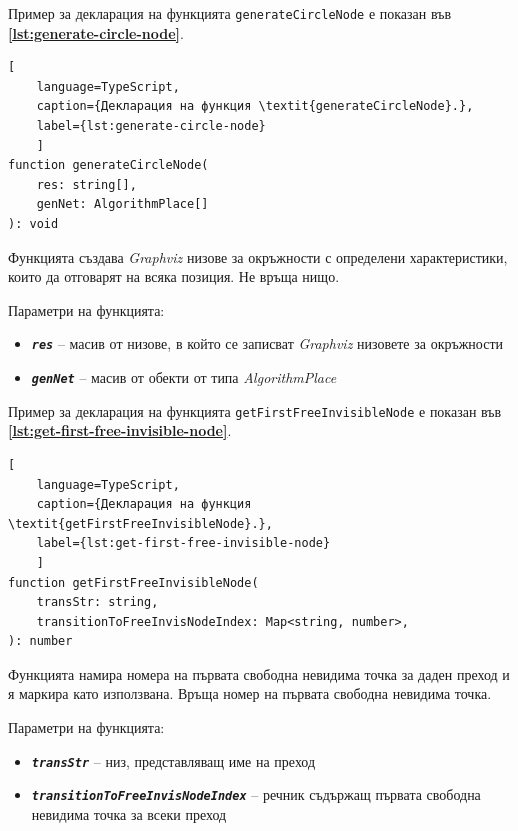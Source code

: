 \vspace{0.55cm}

Пример за декларация на функцията \texttt{generateCircleNode} е показан във \textbf{\autoref{lst:generate-circle-node}}.
\begin{lstlisting}[
	language=TypeScript,
	caption={Декларация на функция \textit{generateCircleNode}.},
	label={lst:generate-circle-node}
	]
function generateCircleNode(
    res: string[],
    genNet: AlgorithmPlace[]
): void
\end{lstlisting}

Функцията създава \textit{Graphviz} низове за окръжности с определени характеристики, които да отговарят на всяка позиция. Не връща нищо.

Параметри на функцията:

\vspace{-0.3cm}

\begin{itemize}
	\item \texttt{\textbf{\textit{res}}} -- масив от низове, в който се записват \textit{Graphviz} низовете за окръжности
	\item \texttt{\textbf{\textit{genNet}}} -- масив от обекти от типа \textit{AlgorithmPlace}
\end{itemize}

\vspace{0.55cm}
Пример за декларация на функцията \texttt{getFirstFreeInvisibleNode} е показан във \textbf{\autoref{lst:get-first-free-invisible-node}}.
\begin{lstlisting}[
	language=TypeScript,
	caption={Декларация на функция \textit{getFirstFreeInvisibleNode}.},
	label={lst:get-first-free-invisible-node}
	]
function getFirstFreeInvisibleNode(
    transStr: string,
    transitionToFreeInvisNodeIndex: Map<string, number>,
): number
\end{lstlisting}

\vspace{-0.2cm}

Функцията намира номера на първата свободна невидима точка за даден преход и я маркира като използвана. Връща номер на първата свободна невидима точка.

Параметри на функцията:

\vspace{-0.3cm}

\begin{itemize}
	\item \texttt{\textbf{\textit{transStr}}} -- низ, представляващ име на преход
	\item \texttt{\textbf{\textit{transitionToFreeInvisNodeIndex}}} -- речник съдържащ първата свободна невидима точка за всеки преход
\end{itemize}

